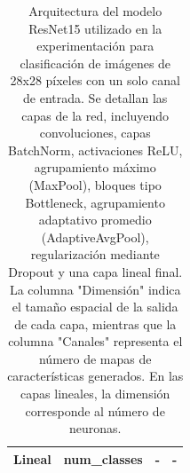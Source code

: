 \begin{table}[]
\begin{tabular}{|c|c|c|c|}
Lineal                         & num\_classes                        & -                                       & -                                 \\ \hline
\end{tabular}
\caption[Arquitectura del modelo ResNet15 utilizado en la experimentación para clasificación de imágenes de 28x28 píxeles con un solo canal de entrada]{Arquitectura del modelo ResNet15 utilizado en la experimentación para clasificación de imágenes de 28x28 píxeles con un solo canal de entrada. Se detallan las capas de la red, incluyendo convoluciones, capas BatchNorm, activaciones ReLU, agrupamiento máximo (MaxPool), bloques tipo Bottleneck, agrupamiento adaptativo promedio (AdaptiveAvgPool), regularización mediante Dropout y una capa lineal final. La columna "Dimensión" indica el tamaño espacial de la salida de cada capa, mientras que la columna "Canales" representa el número de mapas de características generados. En las capas lineales, la dimensión corresponde al número de neuronas.}
\label{table:resnet15}
\end{table}





